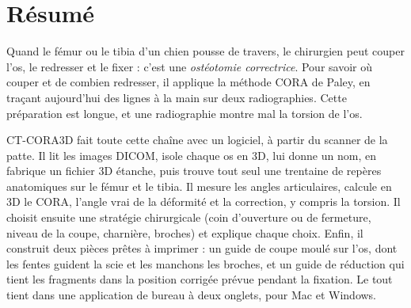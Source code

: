 \documentclass[11pt, a4paper, oneside, openany]{report}
\newcommand{\auteurs}{Dorian Verstappen}
\newcommand{\formation}{Master en ingénierie biomédicale · ECAM Bruxelles}
\newcommand{\equipe}{Projet PMD2}
\newcommand{\referent}{Référent clinique : Anas, chirurgien vétérinaire}
\newcommand{\dateversion}{novembre 2026}
\begin{document}
\begin{titlepage}
\end{titlepage}

\setcounter{page}{2}

\chapter*{Résumé}

Quand le fémur ou le tibia d'un chien pousse de travers, le chirurgien peut couper l'os, le redresser et le fixer :
c'est une \emph{ostéotomie correctrice}. Pour savoir où couper et de combien redresser, il applique la méthode CORA
de Paley, en traçant aujourd'hui des lignes à la main sur deux radiographies. Cette préparation est longue, et une
radiographie montre mal la torsion de l'os.

CT-CORA3D fait toute cette chaîne avec un logiciel, à partir du scanner de la patte. Il lit les images DICOM, isole
chaque os en 3D, lui donne un nom, en fabrique un fichier 3D étanche, puis trouve tout seul une trentaine de repères
anatomiques sur le fémur et le tibia. Il mesure les angles articulaires, calcule en 3D le CORA, l'angle vrai de la
déformité et la correction, y compris la torsion. Il choisit ensuite une stratégie chirurgicale (coin d'ouverture ou
de fermeture, niveau de la coupe, charnière, broches) et explique chaque choix. Enfin, il construit deux pièces
prêtes à imprimer : un guide de coupe moulé sur l'os, dont les fentes guident la scie et les manchons les broches, et
un guide de réduction qui tient les fragments dans la position corrigée prévue pendant la fixation. Le tout tient dans
une application de bureau à deux onglets, pour Mac et Windows.
\end{document}
